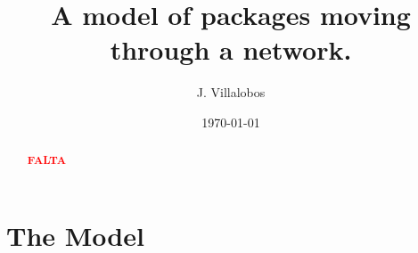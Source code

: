 \documentclass[12pt]{article}
\title{A model of packages moving through a network.}
\author{J. Villalobos}
\date{\today}
\begin{document}
\maketitle

\begin{abstract}
  \textcolor{red}{\large {\bf FALTA}}
\end{abstract}



\section{The Model}
\end{document}
